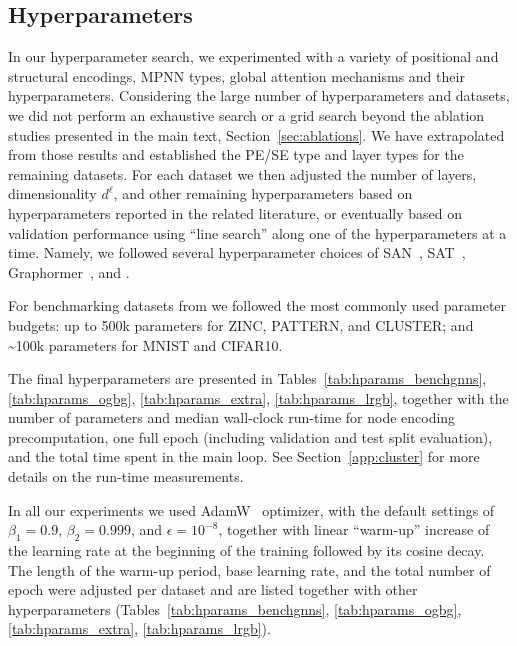 \documentclass{article}
\begin{document}
\subsection{Hyperparameters}\label{app:hyperparams}
In our hyperparameter search, we experimented with a variety of positional and structural encodings, MPNN types, global attention mechanisms and their hyperparameters. Considering the large number of hyperparameters and datasets, we did not perform an exhaustive search or a grid search beyond the ablation studies presented in the main text, Section~\ref{sec:ablations}. We have extrapolated from those results and established the PE/SE type and layer types for the remaining datasets. For each dataset we then adjusted the number of layers, dimensionality $d^\ell$, and other remaining hyperparameters based on hyperparameters reported in the related literature, or eventually based on validation performance using ``line search'' along one of the hyperparameters at a time. Namely, we followed several hyperparameter choices of SAN~\cite{kreuzer2021rethinking}, SAT~\cite{chen2022SAT}, Graphormer~\cite{ying2021graphormer}, and \citet{freitas2021malnet}.

For benchmarking datasets from \citet{dwivedi2020benchmarking} we followed the most commonly used parameter budgets: up to 500k parameters for ZINC, PATTERN, and CLUSTER; and \textasciitilde100k parameters for MNIST and CIFAR10.

The final hyperparameters are presented in Tables~\ref{tab:hparams_benchgnns}, \ref{tab:hparams_ogbg}, \ref{tab:hparams_extra}, \ref{tab:hparams_lrgb}, together with the number of parameters and median wall-clock run-time for node encoding precomputation, one full epoch (including validation and test split evaluation), and the total time spent in the main loop. See Section~\ref{app:cluster} for more details on the run-time measurements.

In all our experiments we used AdamW~\cite{loshchilov2018decoupled} optimizer, with the default settings of $\beta_1=0.9$, $\beta_2=0.999$, and $\epsilon=10^{-8}$, together with linear ``warm-up'' increase of the learning rate at the beginning of the training followed by its cosine decay. The length of the warm-up period, base learning rate, and the total number of epoch were adjusted per dataset and are listed together with other hyperparameters (Tables~\ref{tab:hparams_benchgnns}, \ref{tab:hparams_ogbg}, \ref{tab:hparams_extra}, \ref{tab:hparams_lrgb}).
\end{document}
